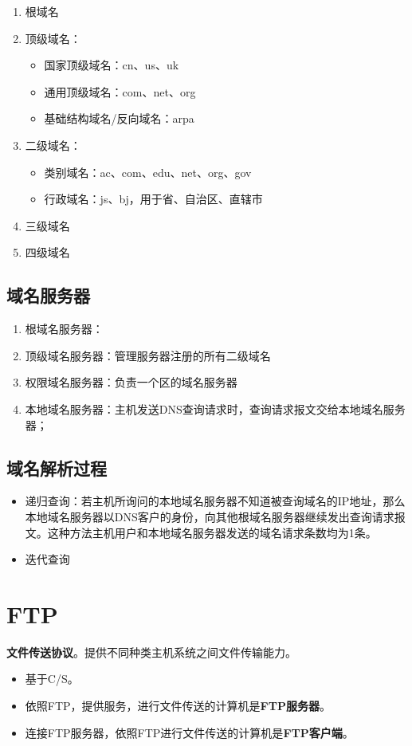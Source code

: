 \begin{enumerate}
    \item 根域名
    \item 顶级域名：\begin{itemize}
        \item 国家顶级域名：cn、us、uk
        \item 通用顶级域名：com、net、org
        \item 基础结构域名/反向域名：arpa
    \end{itemize}
    \item 二级域名：\begin{itemize}
        \item 类别域名：ac、com、edu、net、org、gov
        \item 行政域名：js、bj，用于省、自治区、直辖市
    \end{itemize}
    \item 三级域名
    \item 四级域名
\end{enumerate}


\subsection{域名服务器}
\begin{enumerate}
    \item 根域名服务器：
    \item 顶级域名服务器：管理服务器注册的所有二级域名
    \item 权限域名服务器：负责一个区的域名服务器
    \item 本地域名服务器：主机发送DNS查询请求时，查询请求报文交给本地域名服务器；
\end{enumerate}


\subsection{域名解析过程}

\begin{itemize}
    \item 递归查询：若主机所询问的本地域名服务器不知道被查询域名的IP地址，那么本地域名服务器以DNS客户的身份，向其他根域名服务器继续发出查询请求报文。这种方法主机用户和本地域名服务器发送的域名请求条数均为1条。
    \item 迭代查询
\end{itemize}


\section{FTP}
\textbf{文件传送协议}。提供不同种类主机系统之间文件传输能力。
\begin{itemize}
    \item 基于C/S。
    \item 依照FTP，提供服务，进行文件传送的计算机是\textbf{FTP服务器}。
    \item 连接FTP服务器，依照FTP进行文件传送的计算机是\textbf{FTP客户端}。
\end{itemize}

